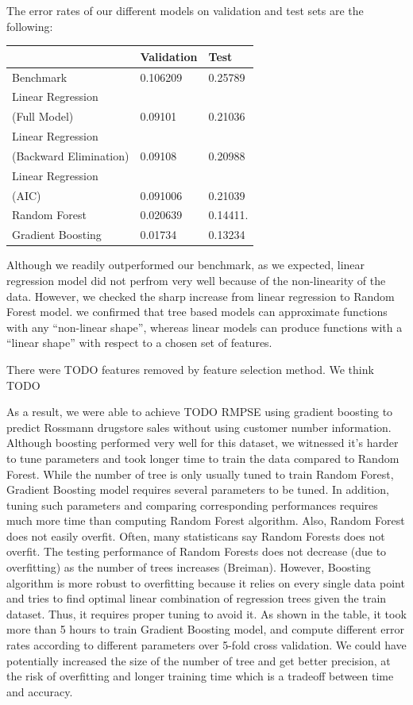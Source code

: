 \documentclass[letterpaper,twocolumn,11pt]{article}
\begin{document}
The error rates of our different models on validation and test sets are the following:
\begin{center}
    \begin{tabular}{| l | l | l |}
      \hline
       & Validation & Test \\ \hline
      Benchmark & 0.106209 & 0.25789  \\ \hline
      Linear Regression \\
      (Full Model) & 0.09101 & 0.21036 \\ \hline
      Linear Regression \\
      (Backward Elimination) & 0.09108 & 0.20988 \\ \hline
      Linear Regression \\
      (AIC) & 0.091006 & 0.21039 \\ \hline
      Random Forest & 0.020639 & 0.14411.  \\ \hline
      Gradient Boosting & 0.01734 & 0.13234  \\ \hline
      \hline    
    \end{tabular}
\end{center}

Although we readily outperformed our benchmark, as we expected, linear regression model did not perfrom very well because of the non-linearity of the data. However, we checked the sharp increase from linear regression to Random Forest model. we confirmed that tree based models can approximate functions with any ``non-linear shape'', whereas linear models can produce functions with a ``linear shape'' with respect to a chosen set of features. 

There were TODO features removed by feature selection method. We think TODO 

As a result, we were able to achieve TODO RMPSE using gradient boosting to predict Rossmann drugstore sales without using customer number information. Although boosting performed very well for this dataset, we witnessed it's harder to tune parameters and took longer time to train the data compared to Random Forest. While the number of tree is only usually tuned to train Random Forest, Gradient Boosting model requires several parameters to be tuned. In addition, tuning such parameters and comparing corresponding performances requires much more time than computing Random Forest algorithm. Also, Random Forest does not easily overfit. Often, many statisticans say Random Forests does not overfit. The testing performance of Random Forests does not decrease (due to overfitting) as the number of trees increases (Breiman). However, Boosting algorithm is more robust to overfitting because it relies on every single data point and tries to find optimal linear combination of regression trees given the train dataset. Thus, it requires proper tuning to avoid it. As shown in the table, it took more than 5 hours to train Gradient Boosting model, and compute different error rates according to different parameters over 5-fold cross validation. We could have potentially increased the size of the number of tree and get better precision, at the risk of overfitting and longer training time which is a tradeoff between time and accuracy.
\end{document}
